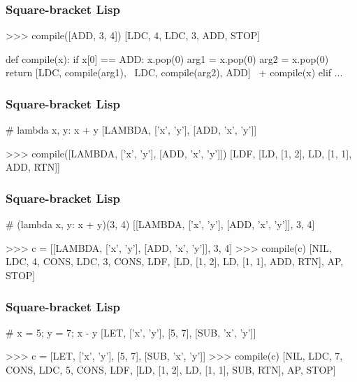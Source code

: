 \documentclass[professionalFonts]{beamer}
\begin{document}
\begin{frame}[fragile]

\frametitle{Square-bracket Lisp}

\begin{python}
[ADD, 3, 4]

>>> compile([ADD, 3, 4])
[LDC, 4, LDC, 3, ADD, STOP]

def compile(x):
    if x[0] == ADD:
        x.pop(0)
        arg1 = x.pop(0)
        arg2 = x.pop(0)
        return [LDC, compile(arg1), \
                LDC, compile(arg2),
                ADD] \
                + compile(x)
    elif ...
\end{python}

\end{frame}


\begin{frame}[fragile]

\frametitle{Square-bracket Lisp}

\begin{python}
# lambda x, y: x + y
[LAMBDA, ['x', 'y'], [ADD, 'x', 'y']]

>>> compile([LAMBDA, ['x', 'y'], [ADD, 'x', 'y']])
[LDF, [LD, [1, 2], LD, [1, 1], ADD, RTN]]
\end{python}

\end{frame}

\begin{frame}[fragile]

\frametitle{Square-bracket Lisp}

\begin{python}
# (lambda x, y: x + y)(3, 4)
[[LAMBDA, ['x', 'y'], [ADD, 'x', 'y']], 3, 4]

>>> c = [[LAMBDA, ['x', 'y'], [ADD, 'x', 'y']], 3, 4]
>>> compile(c)
[NIL, LDC, 4, CONS, LDC, 3, CONS,
 LDF, [LD, [1, 2], LD, [1, 1], ADD, RTN],
 AP,
 STOP]

\end{python}

\end{frame}

\begin{frame}[fragile]
\frametitle{Square-bracket Lisp}

\begin{python}
# x = 5; y = 7; x - y
[LET, ['x', 'y'], [5, 7], [SUB, 'x', 'y']]

>>> c = [LET, ['x', 'y'], [5, 7], [SUB, 'x', 'y']]
>>> compile(c)
[NIL, LDC, 7, CONS, LDC, 5, CONS,
 LDF, [LD, [1, 2], LD, [1, 1], SUB, RTN],
 AP,
 STOP]

\end{python}

\end{frame}
\end{document}
